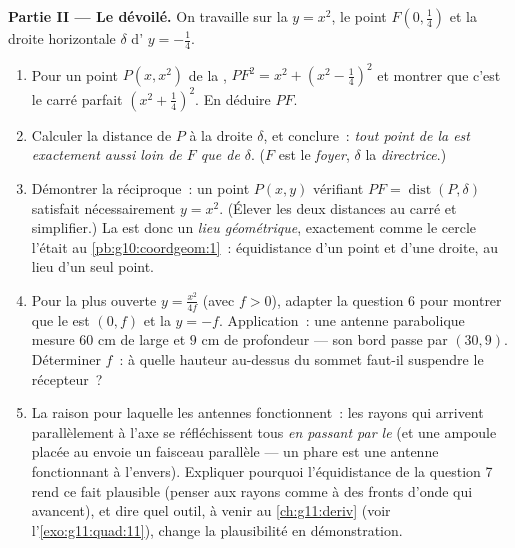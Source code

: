 \begin{problem}
\medskip
\noindent\textbf{Partie II --- Le  dévoilé.}
On travaille sur la  $y = x^2$, le point
$F\left(0, \frac14\right)$ et la droite horizontale $\delta$
d' $y = -\frac14$.
\begin{enumerate}[resume]
  \item Pour un point $P(x, x^2)$ de la , 
        $PF^2 = x^2 + \left(x^2 - \frac14\right)^2$ et montrer que
        c'est le carré parfait $\left(x^2 + \frac14\right)^2$. En
        déduire $PF$.
  \item Calculer la distance de $P$ à la droite $\delta$, et
        conclure~: \emph{tout point de la  est exactement
        aussi loin de $F$ que de $\delta$}. ($F$ est le
        \emph{foyer}, $\delta$ la
        \emph{directrice}.)
  \item Démontrer la réciproque~: un point $P(x, y)$ vérifiant
        $PF = \operatorname{dist}(P, \delta)$ satisfait
        nécessairement $y = x^2$. (Élever les deux distances au
        carré et simplifier.) La  est donc un \emph{lieu
        géométrique}, exactement comme le cercle l'était au
        \cref{pb:g10:coordgeom:1}~: équidistance d'un point et d'une
        droite, au lieu d'un seul point.
  \item Pour la  plus ouverte $y = \frac{x^2}{4f}$ (avec
        $f > 0$), adapter la question 6 pour montrer que le 
        est $(0, f)$ et la  $y = -f$. Application~: une
        antenne parabolique mesure $60$ cm de large et $9$ cm de
        profondeur --- son bord passe par $(30, 9)$. Déterminer
        $f$~: à quelle hauteur au-dessus du sommet faut-il
        suspendre le récepteur~?
  \item La raison pour laquelle les antennes fonctionnent~: les
        rayons qui arrivent parallèlement à l'axe se réfléchissent
        tous \emph{en passant par le } (et une ampoule placée
        au  envoie un faisceau parallèle --- un phare est une
        antenne fonctionnant à l'envers). Expliquer pourquoi
        l'équidistance de la question 7 rend ce fait plausible
        (penser aux rayons comme à des fronts d'onde qui avancent),
        et dire quel outil, à venir au \cref{ch:g11:deriv} (voir
        l'\cref{exo:g11:quad:11}), change la plausibilité en
        démonstration.
\end{enumerate}


\end{problem}
